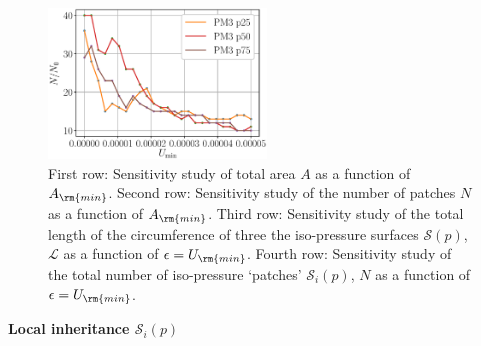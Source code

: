 \documentclass[draft,jgrga]{agutexSI2019}
\begin{document}
\begin{article}
\begin{figure}
\noindent\includegraphics[height=4cm]{figures/SI_figures/N_vs_Umin_PM3.eps}
\caption{First row: Sensitivity study of total area $A$ as a function of $A_{\rm{min}}$. Second row:  Sensitivity study of the number of patches $N$ as a function of $A_{\rm{min}}$. Third row:  Sensitivity study of the total length of the circumference of three the iso-pressure surfaces $\mathcal{S}(p)$, $\mathcal{L}$ as a function of $\epsilon = U_{\rm{min}}$. Fourth row: Sensitivity study of the total number of iso-pressure `patches' $\mathcal{S}_i(p)$, $N$ as a function of $\epsilon = U_{\rm{min}}$.}
\end{figure}





\noindent\textbf{Local inheritance $\mathcal{S}_i(p)$}


\end{article}
\end{document}
